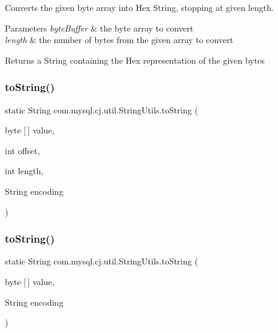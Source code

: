 Converts the given byte array into Hex String, stopping at given length.


\begin{DoxyParams}{Parameters}
{\em byte\+Buffer} & the byte array to convert \\
\hline
{\em length} & the number of bytes from the given array to convert \\
\hline
\end{DoxyParams}
\begin{DoxyReturn}{Returns}
a String containing the Hex representation of the given bytes 
\end{DoxyReturn}
\mbox{\label{classcom_1_1mysql_1_1cj_1_1util_1_1_string_utils_a9e0937d1a6aa36ba315334689fa5aa51}} 
\subsubsection{\texorpdfstring{to\+String()}{toString()}\hspace{0.1cm}{\footnotesize\ttfamily [1/4]}}
{\footnotesize\ttfamily static String com.\+mysql.\+cj.\+util.\+String\+Utils.\+to\+String (\begin{DoxyParamCaption}\item[{byte \mbox{[}$\,$\mbox{]}}]{value,  }\item[{int}]{offset,  }\item[{int}]{length,  }\item[{String}]{encoding }\end{DoxyParamCaption})\hspace{0.3cm}{\ttfamily [static]}}

\mbox{\label{classcom_1_1mysql_1_1cj_1_1util_1_1_string_utils_a9be26e84e45f9349c1de373240562f69}} 
\subsubsection{\texorpdfstring{to\+String()}{toString()}\hspace{0.1cm}{\footnotesize\ttfamily [2/4]}}
{\footnotesize\ttfamily static String com.\+mysql.\+cj.\+util.\+String\+Utils.\+to\+String (\begin{DoxyParamCaption}\item[{byte \mbox{[}$\,$\mbox{]}}]{value,  }\item[{String}]{encoding }\end{DoxyParamCaption})\hspace{0.3cm}{\ttfamily [static]}}

